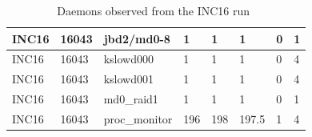 \begin{table}[h]
\begin{center}
{\begin{tabular}{l|l|l|l|l|l|l|l}
INC16     & 16043     & jbd2/md0-8     & 1     & 1     & 1     & 0     & 1\\ \hline
INC16     & 16043     & kslowd000     & 1     & 1     & 1     & 0     & 4\\ \hline
INC16     & 16043     & kslowd001     & 1     & 1     & 1     & 0     & 4\\ \hline
INC16     & 16043     & md0\_raid1     & 1     & 1     & 1     & 0     & 1\\ \hline
INC16     & 16043     & proc\_monitor     & 196     & 198     & 197.5     & 1     & 4\\ \hline \hline

\end{tabular}
}
\end{center}
\caption{Daemons observed from the INC16 run~\label{tab:inc16_daemons}}
\end{table}
